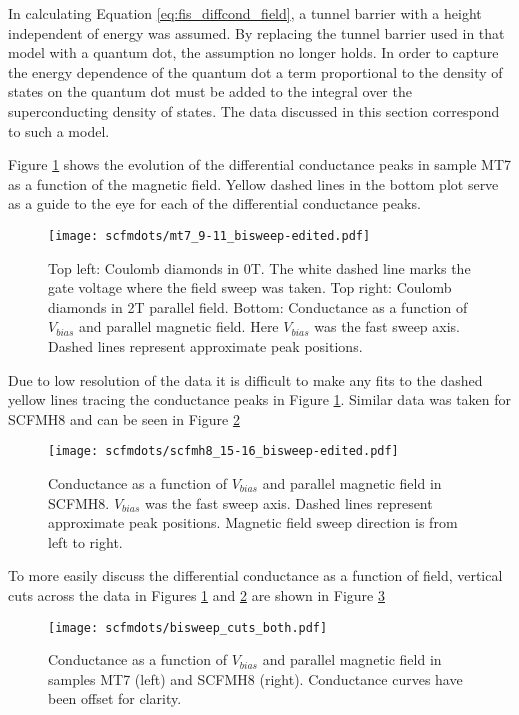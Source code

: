 In calculating Equation \ref{eq:fis_diffcond_field}, a tunnel barrier with a height independent of energy was assumed. By replacing the tunnel barrier used in that model with a quantum dot, the assumption no longer holds. In order to capture the energy dependence of the quantum dot a term proportional to the density of states on the quantum dot must be added to the integral over the superconducting density of states. The data discussed in this section correspond to such a model.

Figure \ref{fig:mt7_bisweep_edit} shows the evolution of the differential conductance peaks in sample MT7 as a function of the magnetic field. Yellow dashed lines in the bottom plot serve as a guide to the eye for each of the differential conductance peaks.

\begin{figure}
    \centering
    \texttt{[image: scfmdots/mt7\_9-11\_bisweep-edited.pdf]}
    \caption{Top left: Coulomb diamonds in 0T. The white dashed line marks the gate voltage where the field sweep was taken. Top right: Coulomb diamonds in 2T parallel field. Bottom: Conductance as a function of $V_{bias}$ and parallel magnetic field. Here $V_{bias}$ was the fast sweep axis. Dashed lines represent approximate peak positions.}
    \label{fig:mt7_bisweep_edit}
\end{figure}

Due to low resolution of the data it is difficult to make any fits to the dashed yellow lines tracing the conductance peaks in Figure \ref{fig:mt7_bisweep_edit}. Similar data was taken for SCFMH8 and can be seen in Figure \ref{fig:scfmh8_bisweep_edit}

\begin{figure}
    \centering
    \texttt{[image: scfmdots/scfmh8\_15-16\_bisweep-edited.pdf]}
    \caption{Conductance as a function of $V_{bias}$ and parallel magnetic field in SCFMH8. $V_{bias}$ was the fast sweep axis. Dashed lines represent approximate peak positions. Magnetic field sweep direction is from left to right.}
    \label{fig:scfmh8_bisweep_edit}
\end{figure}

To more easily discuss the differential conductance as a function of field, vertical cuts across the data in Figures \ref{fig:mt7_bisweep_edit} and \ref{fig:scfmh8_bisweep_edit} are shown in Figure \ref{fig:bisweep_cuts_all}

\begin{figure}
    \centering
    \texttt{[image: scfmdots/bisweep\_cuts\_both.pdf]}
    \caption{Conductance as a function of $V_{bias}$ and parallel magnetic field in samples MT7 (left) and SCFMH8 (right). Conductance curves have been offset for clarity.}
    \label{fig:bisweep_cuts_all}
\end{figure}

